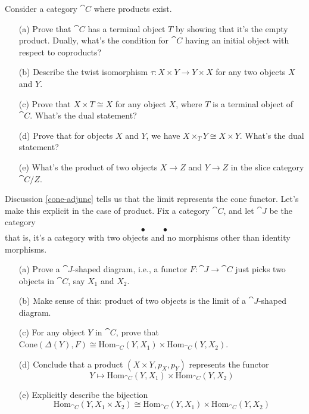 \vspace*{0.1in}

\begin{problem}\label{prob 6.3a}
Consider a category $\cat{C}$ where products exist.
\begin{itemize}
\item[(a)] Prove that $\cat{C}$ has a terminal object $T$ by showing that it's the empty product. Dually, what's the condition for $\cat{C}$ having an initial object with respect to coproducts?
\item[(b)] Describe the twist isomorphism $\tau: X \times Y \to Y \times X$ for any two objects $X$ and $Y$.
\item[(c)] Prove that $X \times T \cong X$ for any object $X$, where $T$ is a terminal object of $\cat{C}$. What's the dual statement?
\item[(d)] Prove that for objects $X$ and $Y$, we have $X \times_T Y \cong X \times Y$. What's the dual statement?
\item[(e)] What's the product of two objects $X \to Z$ and $Y \to Z$ in the slice category $\cat{C}/Z$.
\end{itemize}
\end{problem}

\vspace*{0.1in}

\begin{problem}\label{prob 6.3b}
Discussion \ref{cone-adjunc} tells us that the limit represents the cone functor. Let's make this explicit in the case of product. Fix a category $\cat{C}$, and let $\cat{J}$ be the category
\[\bullet\qquad \bullet\]
that is, it's a category with two objects and no morphisms other than identity morphisms.
\begin{itemize}
\item[(a)] Prove a $\cat{J}$-shaped diagram, i.e., a functor $F:\cat{J} \to \cat{C}$ just picks two objects in $\cat{C}$, say $X_1$ and $X_2$.
\item[(b)] Make sense of this: product of two objects is the limit of a $\cat{J}$-shaped diagram.
\item[(c)] For any object $Y$ in $\cat{C}$, prove that $\mathrm{Cone}(\Delta(Y),F) \cong \mathrm{Hom}_{\cat{C}}(Y,X_1) \times \mathrm{Hom}_{\cat{C}}(Y,X_2)$.
\item[(d)] Conclude that a product $(X \times Y,p_X,p_Y)$ represents the functor
\[Y \mapsto \mathrm{Hom}_{\cat{C}}(Y,X_1) \times \mathrm{Hom}_{\cat{C}}(Y,X_2)\]
\item[(e)] Explicitly describe the bijection
\[\mathrm{Hom}_{\cat{C}}(Y,X_1 \times X_2) \cong \mathrm{Hom}_{\cat{C}}(Y,X_1) \times \mathrm{Hom}_{\cat{C}}(Y,X_2)\]
\end{itemize}
\end{problem}


